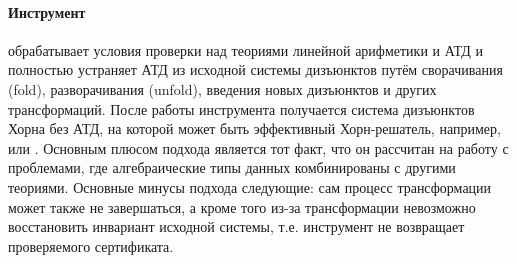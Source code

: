 \paragraph{Инструмент \vericat{}~\cite{10.1093/logcom/exab090,pettorossi_proietti_2022,10.1007/978-3-030-51074-9_6,angelis_fioravanti_pettorossi_proietti_2018}} обрабатывает условия проверки над теориями линейной арифметики и АТД и полностью устраняет АТД из исходной системы дизъюнктов путём сворачивания (fold), разворачивания (unfold), введения новых дизъюнктов и других трансформаций.
После работы инструмента получается система дизъюнктов Хорна без АТД, на которой может быть эффективный Хорн-решатель, например, \spacer{} или \eldarica{}.
Основным плюсом подхода является тот факт, что он рассчитан на работу с проблемами, где алгебраические типы данных комбинированы с другими теориями.
Основные минусы подхода следующие: сам процесс трансформации может также не завершаться, а кроме того из-за трансформации невозможно восстановить инвариант исходной системы, т.\:е. инструмент не возвращает проверяемого сертификата.



